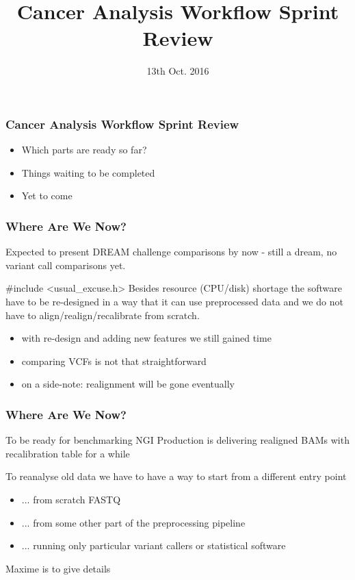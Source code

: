 \documentclass{beamer}
\title{Cancer Analysis Workflow Sprint Review}
\institute{SciLifeLab}
\date{13th Oct. 2016 }
\begin{document}
\frame{\titlepage}
			  
\begin{frame}
\frametitle{Cancer Analysis Workflow Sprint Review}
\begin{itemize}
	\item Which parts are ready so far?
	\item Things waiting to be completed
	\item Yet to come
\end{itemize}
\end{frame}

\begin{frame}
\frametitle{Where Are We Now?}
Expected to present DREAM challenge comparisons by now - still a dream, no variant call comparisons yet.
	\begin{block}{\#include \textless usual\_excuse.h\textgreater}
	Besides resource (CPU/disk) shortage the software have to be re-designed in a way that it can use preprocessed data
	and we do not have to align/realign/recalibrate from scratch.
	\end{block}
	\begin{itemize}
		\item with re-design and adding new features we still gained time
		\item comparing VCFs is not that straightforward
		\item on a side-note: realignment will be gone eventually
	\end{itemize}
\end{frame}

\begin{frame}
\frametitle{Where Are We Now?}
	\begin{block}{To be ready for benchmarking}
		NGI Production is delivering realigned BAMs with recalibration table for a while

		To reanalyse old data we have to have a way to start from a different entry point

		\begin{itemize}
			\item ... from scratch FASTQ
			\item ... from some other part of the preprocessing pipeline
			\item ... running only particular variant callers or statistical software
		\end{itemize}
		Maxime is to give details
	\end{block}
\end{frame}
\end{document}
